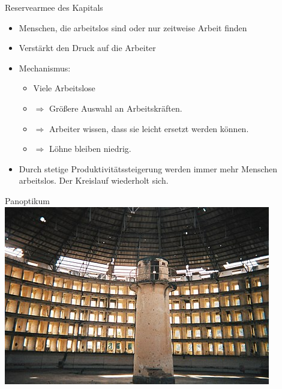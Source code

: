 \documentclass{beamer}
\begin{document}
\begin{frame}{Reservearmee des Kapitals}
\begin{itemize}
    \item Menschen, die arbeitslos sind oder nur zeitweise Arbeit finden
    \item Verstärkt den Druck auf die Arbeiter
    \item Mechanismus:
    \begin{itemize}
        \item Viele Arbeitslose
        \item $\Rightarrow$ Größere Auswahl an Arbeitskräften.
        \item $\Rightarrow$ Arbeiter wissen, dass sie leicht ersetzt werden können.
        \item $\Rightarrow$ Löhne bleiben niedrig.
    \end{itemize}
    \item Durch stetige Produktivitätssteigerung werden immer mehr Menschen arbeitslos. Der Kreislauf wiederholt sich.
\end{itemize}

\end{frame}
\begin{frame}{Panoptikum}
    \includegraphics[width=\textwidth]{Panoptikum}
\end{frame}
\end{document}
